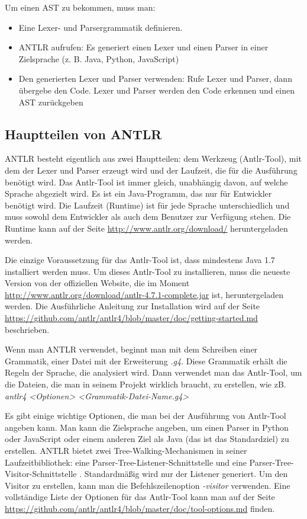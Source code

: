 Um einen AST zu bekommen, muss man:
\begin{itemize}
\item Eine Lexer- und Parsergrammatik definieren.
\item ANTLR aufrufen: Es generiert einen Lexer und einen Parser in einer Zielsprache (z. B. Java, Python, JavaScript)
\item Den generierten Lexer und Parser verwenden: Rufe Lexer und Parser, dann übergebe den Code. Lexer und Parser werden den Code erkennen und einen AST zurückgeben
\end{itemize}

\subsection{Hauptteilen von ANTLR}
ANTLR besteht eigentlich aus zwei Hauptteilen: dem Werkzeug (Antlr-Tool), mit dem der Lexer und Parser erzeugt wird und der Laufzeit, die für die Ausführung benötigt wird. Das Antlr-Tool ist immer gleich, unabhängig davon, auf welche Sprache abgezielt wird. Es ist ein Java-Programm, das nur für Entwickler benötigt wird. Die Laufzeit (Runtime) ist für jede Sprache unterschiedlich und muss sowohl dem Entwickler als auch dem Benutzer zur Verfügung stehen. Die Runtime kann auf der Seite \url{http://www.antlr.org/download/} heruntergeladen werden. 

Die einzige Voraussetzung für das Antlr-Tool ist, dass mindestens Java 1.7 installiert werden muss. Um dieses Antlr-Tool zu installieren, muss die neueste Version von der offiziellen Website, die im Moment \url{http://www.antlr.org/download/antlr-4.7.1-complete.jar} ist, heruntergeladen werden. Die Ausführliche Anleitung zur Installation wird auf der Seite \url{https://github.com/antlr/antlr4/blob/master/doc/getting-started.md} beschrieben.

Wenn man ANTLR verwendet, beginnt man mit dem Schreiben einer Grammatik, einer Datei mit der Erweiterung \textit{.g4}. Diese Grammatik erhält die Regeln der Sprache, die analysiert wird. Dann verwendet man das Antlr-Tool, um die Dateien, die man in seinem Projekt wirklich braucht, zu erstellen,  wie zB. \textit{antlr4 <Optionen> <Grammatik-Datei-Name.g4>}

Es gibt einige wichtige Optionen, die man bei der Ausführung von Antlr-Tool angeben kann. Man kann die Zielsprache angeben, um einen Parser in Python oder JavaScript oder einem anderen Ziel als Java (das ist das Standardziel) zu erstellen.
ANTLR bietet zwei Tree-Walking-Mechanismen in seiner Laufzeitbibliothek: eine Parser-Tree-Listener-Schnittstelle und eine Parser-Tree-Visitor-Schnittstelle \cite{Parr}. Standardmäßig wird nur der Listener generiert. Um den Visitor zu erstellen, kann man die Befehlszeilenoption \textit{-visitor} verwenden. Eine vollständige Liste der Optionen für das Antlr-Tool kann man auf der Seite \url{https://github.com/antlr/antlr4/blob/master/doc/tool-options.md} finden.


